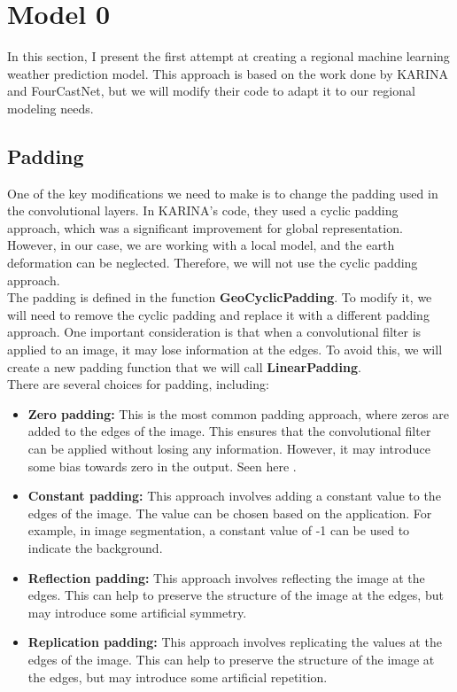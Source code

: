 \section{Model 0}

In this section, I present the first attempt at creating a regional machine learning weather prediction model. This approach is based on the work done by KARINA and FourCastNet, but we will modify their code to adapt it to our regional modeling needs.\\

\subsection*{Padding}

One of the key modifications we need to make is to change the padding used in the convolutional layers. In KARINA's code, they used a cyclic padding approach, which was a significant improvement for global representation. However, in our case, we are working with a local model, and the earth deformation can be neglected. Therefore, we will not use the cyclic padding approach.\\

The padding is defined in the function \textbf{GeoCyclicPadding}. To modify it, we will need to remove the cyclic padding and replace it with a different padding approach. One important consideration is that when a convolutional filter is applied to an image, it may lose information at the edges. To avoid this, we will create a new padding function that we will call \textbf{LinearPadding}.\\

There are several choices for padding, including:\\

\begin{itemize}
\item \textbf{Zero padding:} This is the most common padding approach, where zeros are added to the edges of the image. This ensures that the convolutional filter can be applied without losing any information. However, it may introduce some bias towards zero in the output. Seen here \cite{padding2002}.
\item \textbf{Constant padding:} This approach involves adding a constant value to the edges of the image. The value can be chosen based on the application. For example, in image segmentation, a constant value of -1 can be used to indicate the background.
\item \textbf{Reflection padding:} This approach involves reflecting the image at the edges. This can help to preserve the structure of the image at the edges, but may introduce some artificial symmetry.
\item \textbf{Replication padding:} This approach involves replicating the values at the edges of the image. This can help to preserve the structure of the image at the edges, but may introduce some artificial repetition.
\end{itemize}

